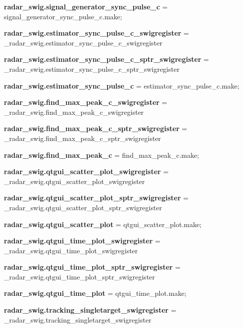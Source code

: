 \begin{DoxyCompactItemize}
\item 
{\bf radar\+\_\+swig.\+signal\+\_\+generator\+\_\+sync\+\_\+pulse\+\_\+c} = signal\+\_\+generator\+\_\+sync\+\_\+pulse\+\_\+c.\+make;
\item 
{\bf radar\+\_\+swig.\+estimator\+\_\+sync\+\_\+pulse\+\_\+c\+\_\+swigregister} = \+\_\+radar\+\_\+swig.\+estimator\+\_\+sync\+\_\+pulse\+\_\+c\+\_\+swigregister
\item 
{\bf radar\+\_\+swig.\+estimator\+\_\+sync\+\_\+pulse\+\_\+c\+\_\+sptr\+\_\+swigregister} = \+\_\+radar\+\_\+swig.\+estimator\+\_\+sync\+\_\+pulse\+\_\+c\+\_\+sptr\+\_\+swigregister
\item 
{\bf radar\+\_\+swig.\+estimator\+\_\+sync\+\_\+pulse\+\_\+c} = estimator\+\_\+sync\+\_\+pulse\+\_\+c.\+make;
\item 
{\bf radar\+\_\+swig.\+find\+\_\+max\+\_\+peak\+\_\+c\+\_\+swigregister} = \+\_\+radar\+\_\+swig.\+find\+\_\+max\+\_\+peak\+\_\+c\+\_\+swigregister
\item 
{\bf radar\+\_\+swig.\+find\+\_\+max\+\_\+peak\+\_\+c\+\_\+sptr\+\_\+swigregister} = \+\_\+radar\+\_\+swig.\+find\+\_\+max\+\_\+peak\+\_\+c\+\_\+sptr\+\_\+swigregister
\item 
{\bf radar\+\_\+swig.\+find\+\_\+max\+\_\+peak\+\_\+c} = find\+\_\+max\+\_\+peak\+\_\+c.\+make;
\item 
{\bf radar\+\_\+swig.\+qtgui\+\_\+scatter\+\_\+plot\+\_\+swigregister} = \+\_\+radar\+\_\+swig.\+qtgui\+\_\+scatter\+\_\+plot\+\_\+swigregister
\item 
{\bf radar\+\_\+swig.\+qtgui\+\_\+scatter\+\_\+plot\+\_\+sptr\+\_\+swigregister} = \+\_\+radar\+\_\+swig.\+qtgui\+\_\+scatter\+\_\+plot\+\_\+sptr\+\_\+swigregister
\item 
{\bf radar\+\_\+swig.\+qtgui\+\_\+scatter\+\_\+plot} = qtgui\+\_\+scatter\+\_\+plot.\+make;
\item 
{\bf radar\+\_\+swig.\+qtgui\+\_\+time\+\_\+plot\+\_\+swigregister} = \+\_\+radar\+\_\+swig.\+qtgui\+\_\+time\+\_\+plot\+\_\+swigregister
\item 
{\bf radar\+\_\+swig.\+qtgui\+\_\+time\+\_\+plot\+\_\+sptr\+\_\+swigregister} = \+\_\+radar\+\_\+swig.\+qtgui\+\_\+time\+\_\+plot\+\_\+sptr\+\_\+swigregister
\item 
{\bf radar\+\_\+swig.\+qtgui\+\_\+time\+\_\+plot} = qtgui\+\_\+time\+\_\+plot.\+make;
\item 
{\bf radar\+\_\+swig.\+tracking\+\_\+singletarget\+\_\+swigregister} = \+\_\+radar\+\_\+swig.\+tracking\+\_\+singletarget\+\_\+swigregister
\item 

\end{DoxyCompactItemize}
